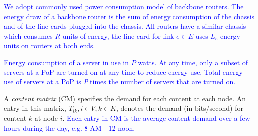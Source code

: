 \textcolor{blue}{We adopt commonly used power consumption model of backbone routers. The energy draw of a backbone router is the sum of energy consumption of the chassis  and of the line cards plugged into the chassis.  All routers have a similar chassis which consumes $R$ units of energy, the line card for link $e \in E$ uses $L_e$ energy units on routers at both ends.}

\textcolor{blue}{Energy consumption of a server in use in $P$ watts. At any time, only a subset of servers at a PoP are turned on at any time to reduce energy use. Total energy use of servers at a PoP is $P$ times the number of servers that are turned on.}






A {\em content matrix} (CM) specifies the demand for each content at each node. An entry in this matrix, $T_{ik}, i\in V, k\in K$, denotes the demand (in bits/second) for content $k$ at node $i$. 
\textcolor{blue}{Each entry in CM is the average content demand over a few hours during the day, e.g. 8 AM - 12 noon.}




